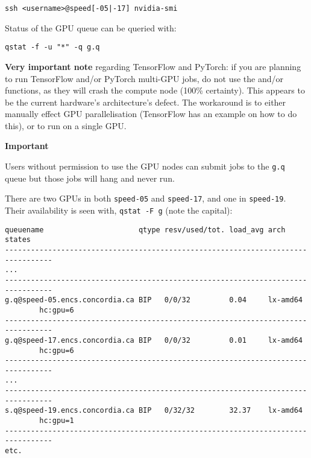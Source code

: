 \documentclass{easychair}
\begin{document}
\begin{verbatim}
ssh <username>@speed[-05|-17] nvidia-smi
\end{verbatim}

Status of the GPU queue can be queried with:

\begin{verbatim}
qstat -f -u "*" -q g.q
\end{verbatim}

\textbf{Very important note} regarding TensorFlow and PyTorch: if you are planning
to run TensorFlow and/or PyTorch multi-GPU jobs, do not use the
 and/or  functions, as they will crash
the compute node (100\% certainty). This appears to be the current hardware's architecture's defect.
%
The workaround is to either
manually effect GPU parallelisation (TensorFlow has an example on how to
do this), or to run on a single GPU.

\vspace{10pt}
\noindent
\textbf{Important}
\vspace{10pt}

Users without permission to use the GPU nodes can submit jobs to the \texttt{g.q}
queue but those jobs will hang and never run.

There are two GPUs in both \texttt{speed-05} and \texttt{speed-17}, and one 
in \texttt{speed-19}. Their availability is seen with, \texttt{qstat -F g}
(note the capital): 

\small
\begin{verbatim}
queuename                      qtype resv/used/tot. load_avg arch          states
---------------------------------------------------------------------------------
...
---------------------------------------------------------------------------------
g.q@speed-05.encs.concordia.ca BIP   0/0/32         0.04     lx-amd64
        hc:gpu=6
---------------------------------------------------------------------------------
g.q@speed-17.encs.concordia.ca BIP   0/0/32         0.01     lx-amd64
        hc:gpu=6
---------------------------------------------------------------------------------
...
---------------------------------------------------------------------------------
s.q@speed-19.encs.concordia.ca BIP   0/32/32        32.37    lx-amd64
        hc:gpu=1
---------------------------------------------------------------------------------
etc. 
\end{verbatim}
\normalsize
\end{document}
